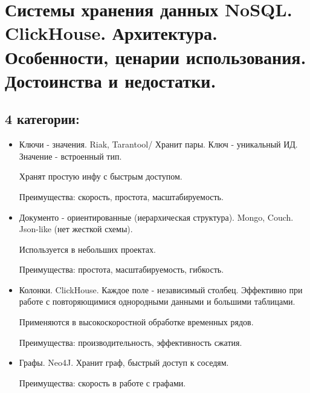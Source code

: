 \section{Системы хранения данных NoSQL. ClickHouse. Архитектура. Особенности, ценарии использования. Достоинства и недостатки.}

\subsection*{4 категории:}
\begin{itemize}
    \item Ключи - значения. Riak, Tarantool/
    Хранит пары. Ключ - уникальный ИД. Значение - встроенный тип.

    Хранят простую инфу с быстрым доступом.

    Преимущества: скорость, простота, масштабируемость.
    \item Документо - ориентированные (иерархическая структура). Mongo, Couch.
    Json-like (нет жесткой схемы).
    
    Используется в небольших проектах.
    
    Преимущества: простота, масштабируемость, гибкость.
    \item Колонки. ClickHouse.
    Каждое поле - независимый столбец. Эффективно при работе с повторяющимися
    однородными данными и большими таблицами.
    
    Применяются в высокоскоростной обработке временных рядов.
    
    Преимущества: производительность, эффективность сжатия.
    \item Графы. Neo4J.
    Хранит граф, быстрый доступ к соседям.
    
    Преимущества: скорость в работе с графами.
\end{itemize}
